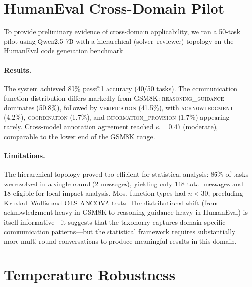 
\section{HumanEval Cross-Domain Pilot}
\label{app:humaneval-pilot}

To provide preliminary evidence of cross-domain applicability, we ran a 50-task pilot using Qwen2.5-7B with a hierarchical (solver--reviewer) topology on the HumanEval code generation benchmark \cite{chen_humaneval_2021}.

\paragraph{Results.} The system achieved 80\% pass@1 accuracy (40/50 tasks). The communication function distribution differs markedly from GSM8K: \textsc{reasoning\_guidance} dominates (50.8\%), followed by \textsc{verification} (41.5\%), with \textsc{acknowledgment} (4.2\%), \textsc{coordination} (1.7\%), and \textsc{information\_provision} (1.7\%) appearing rarely. Cross-model annotation agreement reached $\kappa = 0.47$ (moderate), comparable to the lower end of the GSM8K range.

\paragraph{Limitations.} The hierarchical topology proved too efficient for statistical analysis: 86\% of tasks were solved in a single round (2 messages), yielding only 118 total messages and 18 eligible for local impact analysis. Most function types had $n < 30$, precluding Kruskal--Wallis and OLS ANCOVA tests. The distributional shift (from acknowledgment-heavy in GSM8K to reasoning-guidance-heavy in HumanEval) is itself informative---it suggests that the taxonomy captures domain-specific communication patterns---but the statistical framework requires substantially more multi-round conversations to produce meaningful results in this domain.

\section{Temperature Robustness}
\label{app:temp-robustness}

